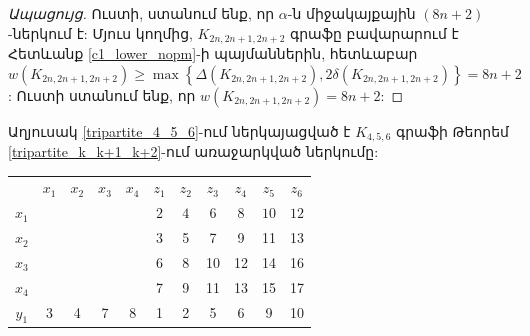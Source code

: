 \begin{proof}[Ապացույց]
Ուստի, ստանում ենք, որ $\alpha$-ն միջակայքային $(8n+2)$-ներկում է: Մյուս կողմից, $K_{2n, 2n+1, 2n+2}$ գրաֆը բավարարում է Հետևանք \ref{c1_lower_nopm}-ի պայմաններին, հետևաբար $w(K_{2n, 2n+1, 2n+2}) \geq \max\left\{\Delta(K_{2n, 2n+1, 2n+2}),2\delta(K_{2n, 2n+1, 2n+2})\right\} = 8n+2$: Ուստի ստանում ենք, որ $w(K_{2n, 2n+1, 2n+2}) = 8n+2$:
\end{proof}

Աղյուսակ \ref{tripartite_4_5_6}-ում ներկայացված է $K_{4,5,6}$ գրաֆի Թեորեմ \ref{tripartite_k_k+1_k+2}-ում առաջարկված ներկումը:

\begin{table}[]
\centering
\begin{tabular}{ccccccccccc}
                           & $x_1$                   & $x_2$                   & $x_3$                   & $x_4$                   & $z_1$                    & $z_2$                    & $z_3$                    & $z_4$                    & $z_5$                     & $z_6$                     \\ \cline{6-11} 
$x_1$                      &                         &                         &                         & \multicolumn{1}{c|}{}   & \multicolumn{1}{c|}{$2$} & \multicolumn{1}{c|}{$4$} & \multicolumn{1}{c|}{$6$} & \multicolumn{1}{c|}{$8$} & \multicolumn{1}{c|}{$10$} & \multicolumn{1}{c|}{$12$} \\ \cline{6-11} 
$x_2$                      &                         &                         &                         & \multicolumn{1}{c|}{}   & \multicolumn{1}{c|}{3}   & \multicolumn{1}{c|}{5}   & \multicolumn{1}{c|}{7}   & \multicolumn{1}{c|}{9}   & \multicolumn{1}{c|}{11}   & \multicolumn{1}{c|}{13}   \\ \cline{6-11} 
$x_3$                      &                         &                         &                         & \multicolumn{1}{c|}{}   & \multicolumn{1}{c|}{6}   & \multicolumn{1}{c|}{8}   & \multicolumn{1}{c|}{10}  & \multicolumn{1}{c|}{12}  & \multicolumn{1}{c|}{14}   & \multicolumn{1}{c|}{16}   \\ \cline{6-11} 
$x_4$                      &                         &                         &                         & \multicolumn{1}{c|}{}   & \multicolumn{1}{c|}{7}   & \multicolumn{1}{c|}{9}   & \multicolumn{1}{c|}{11}  & \multicolumn{1}{c|}{13}  & \multicolumn{1}{c|}{15}   & \multicolumn{1}{c|}{17}   \\ \cline{2-11} 
\multicolumn{1}{c|}{$y_1$} & \multicolumn{1}{c|}{3}  & \multicolumn{1}{c|}{4}  & \multicolumn{1}{c|}{7}  & \multicolumn{1}{c|}{8}  & \multicolumn{1}{c|}{1}   & \multicolumn{1}{c|}{2}   & \multicolumn{1}{c|}{5}   & \multicolumn{1}{c|}{6}   & \multicolumn{1}{c|}{9}    & \multicolumn{1}{c|}{10}   \\ \cline{2-11} 

\end{tabular}
\end{table}
